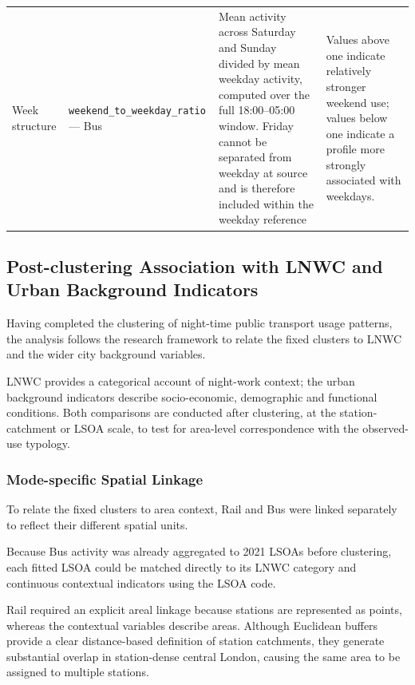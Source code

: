 \begin{longtable}{@{}p{2.25cm} p{3.05cm} p{5.15cm} p{4.25cm}@{}}
Week structure & \texttt{weekend\_\allowbreak to\_\allowbreak weekday\_\allowbreak ratio} --- Bus & Mean activity across Saturday and Sunday divided by mean weekday activity, computed over the full 18:00--05:00 window. Friday cannot be separated from weekday at source and is therefore included within the weekday reference & Values above one indicate relatively stronger weekend use; values below one indicate a profile more strongly associated with weekdays. \\
\end{longtable}
\endgroup

\subsection{Post-clustering Association with LNWC and Urban Background Indicators}

Having completed the clustering of night-time public transport usage patterns, the analysis follows the research framework to relate the fixed clusters to LNWC and the wider city background variables.

LNWC provides a categorical account of night-work context; the urban background indicators describe socio-economic, demographic and functional conditions. Both comparisons are conducted after clustering, at the station-catchment or LSOA scale, to test for area-level correspondence with the observed-use typology.

\subsubsection{Mode-specific Spatial Linkage}

To relate the fixed clusters to area context, Rail and Bus were linked separately to reflect their different spatial units.


Because Bus activity was already aggregated to 2021 LSOAs before clustering, each fitted LSOA could be matched directly to its LNWC category and continuous contextual indicators using the LSOA code.


Rail required an explicit areal linkage because stations are represented as points, whereas the contextual variables describe areas. Although Euclidean buffers provide a clear distance-based definition of station catchments, they generate substantial overlap in station-dense central London, causing the same area to be assigned to multiple stations.

